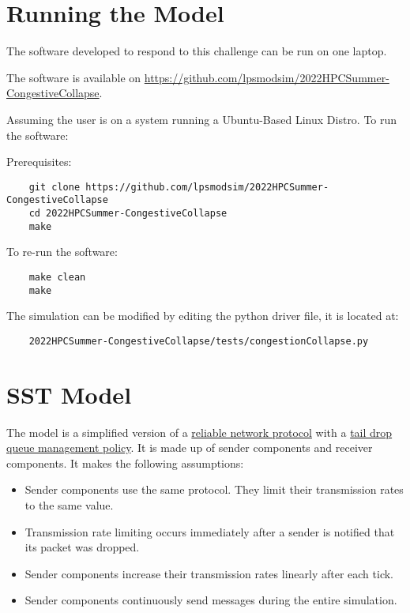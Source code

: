 \documentclass{article}
\begin{document}
\section{Running the Model}

The software developed to respond to this challenge can be run on one laptop.

\noindent The software is available on \href{https://github.com/lpsmodsim/2022HPCSummer-CongestiveCollapse}{https://github.com/lpsmodsim/2022HPCSummer-CongestiveCollapse}.\newline

\noindent Assuming the user is on a system running a Ubuntu-Based Linux Distro. To run the software:

\noindent Prerequisites: 


\begin{verbatim}
	git clone https://github.com/lpsmodsim/2022HPCSummer-CongestiveCollapse
	cd 2022HPCSummer-CongestiveCollapse
	make
\end{verbatim}

\noindent To re-run the software:

\begin{verbatim}
	make clean
	make
\end{verbatim}

\noindent The simulation can be modified by editing the python driver file, it is located at:

\begin{verbatim}
	2022HPCSummer-CongestiveCollapse/tests/congestionCollapse.py
\end{verbatim}

\section{SST Model}

The model is a simplified version of a \href{https://en.wikipedia.org/wiki/Reliability_(computer_networking)}{reliable network protocol} with a \href{https://en.wikipedia.org/wiki/Tail_drop}{tail drop queue management policy}. It is made up of sender components and receiver components. It makes the following assumptions:

\begin{itemize}
	\item Sender components use the same protocol. They limit their transmission rates to the same value.
	\item Transmission rate limiting occurs immediately after a sender is notified that its packet was dropped.
	\item Sender components increase their transmission rates linearly after each tick.
	\item Sender components continuously send messages during the entire simulation.
\end{itemize}
\end{document}
